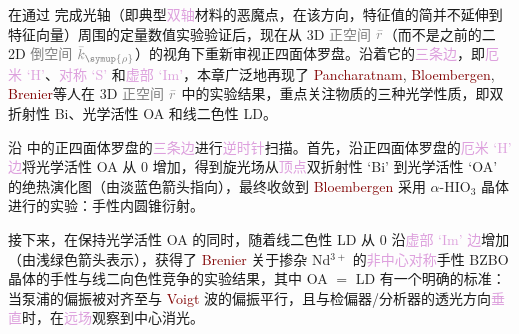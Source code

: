 在通过  完成\textcolor{PineGreen}{光轴}（即典型\textcolor{Plum}{双轴}材料的\textcolor{PineGreen}{恶魔点}，在该方向，\textcolor{PineGreen}{特征值}的简并不延伸到\textcolor{PineGreen}{特征向量}）周围的定量数值实验验证后，现在从 3D \textcolor{gray}{正空间} $\mathcolor{gray}{\bar{r}}$（而不是之前的二 2D \textcolor{gray}{倒空间} $\mathcolor{gray}{\bar{k}_{\symup{\rho}}}$）的视角下重新审视\textcolor{NavyBlue}{正四面体罗盘}。沿着它的\textcolor{Plum}{三条边}，即\textcolor{Plum}{厄米 `H'}、\textcolor{Plum}{对称 `S'} 和\textcolor{Plum}{虚部 `Im'}，本章广泛地再现了 \textcolor{Maroon}{Pancharatnam}\cite{pancharatnamPropagationLightAbsorbing1955}, \textcolor{Maroon}{Bloembergen}\cite{schellLaserStudiesInternal1978b}, \textcolor{Maroon}{Brenier}\cite{brenierVoigtWaveInvestigation2015,brenierLasingConicalDiffraction2016,brenierChiralityDichroismCompetition2017}等人\cite{ballantineConicalDiffractionDispersion2014,zhangNonparaxialIdealizedPolarizer2018,berryOrbitalSpinAngular2005,tangHarmonicSpinOrbit2020,schellLaserStudiesInternal1978b,pancharatnamPropagationLightAbsorbing1955,brenierVoigtWaveInvestigation2015,brenierLasingConicalDiffraction2016,brenierChiralityDichroismCompetition2017}在 3D \textcolor{gray}{正空间} $\mathcolor{gray}{\bar{r}}$ 中的实验结果，重点关注物质的三种光学性质，即\textcolor{NavyBlue}{双折射性 Bi}、\textcolor{NavyBlue}{光学活性 OA} 和\textcolor{NavyBlue}{线二色性 LD}。

沿  中的\textcolor{NavyBlue}{正四面体罗盘}的\textcolor{Plum}{三条边}进行\textcolor{Plum}{逆时针}扫描。首先，沿\textcolor{NavyBlue}{正四面体罗盘}的\textcolor{Plum}{厄米 `H' 边}将\textcolor{NavyBlue}{光学活性 OA} 从 0 增加，得到旋光场从\textcolor{Plum}{顶点}\textcolor{NavyBlue}{双折射性 `Bi'} 到\textcolor{NavyBlue}{光学活性 `OA'} 的\textcolor{NavyBlue}{绝热演化}图（由淡蓝色箭头指向），最终收敛到 \textcolor{Maroon}{Bloembergen} 采用 $\alpha$-HIO$_3$ 晶体进行的实验：\textcolor{NavyBlue}{手性}\textcolor{PineGreen}{内圆锥衍射}\cite{schellLaserStudiesInternal1978b}。

接下来，在保持\textcolor{NavyBlue}{光学活性 OA} 的同时，随着\textcolor{NavyBlue}{线二色性 LD} 从 0 沿\textcolor{Plum}{虚部 `Im' 边}增加（由浅绿色箭头表示），获得了 \textcolor{Maroon}{Brenier} 关于掺杂 Nd$^{3+}$ 的\textcolor{Plum}{非中心对称}\textcolor{NavyBlue}{手性} BZBO 晶体的\textcolor{NavyBlue}{手性}与\textcolor{NavyBlue}{线二向色性}竞争的实验结果，其中 \textcolor{NavyBlue}{OA} $=$ \textcolor{NavyBlue}{LD} 有一个明确的标准：当\textcolor{NavyBlue}{泵浦}的偏振被对齐至与 \textcolor{Maroon}{Voigt} 波的偏振平行，且与\textcolor{PineGreen}{检偏器}/\textcolor{PineGreen}{分析器}的透光方向\textcolor{Plum}{垂直}时，在\textcolor{Plum}{远场}观察到\textcolor{PineGreen}{中心消光}。

